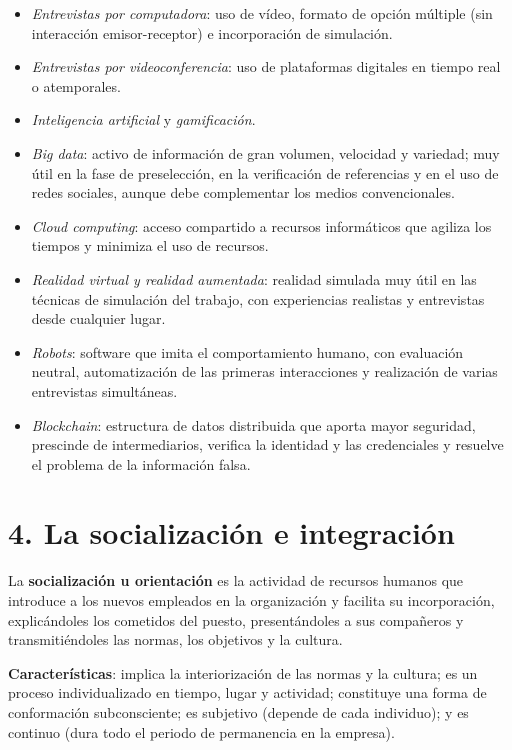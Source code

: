 \documentclass[12pt]{book} %
\providecommand{\tightlist}{%
  \setlength{\itemsep}{0pt}\setlength{\parskip}{0pt}}
\begin{document}
\begin{itemize}
\tightlist
\item
  \emph{Entrevistas por computadora}: uso de vídeo, formato de opción
  múltiple (sin interacción emisor-receptor) e incorporación de
  simulación.
\item
  \emph{Entrevistas por videoconferencia}: uso de plataformas digitales
  en tiempo real o atemporales.
\item
  \emph{Inteligencia artificial} y \emph{gamificación}.
\item
  \emph{Big data}: activo de información de gran volumen, velocidad y
  variedad; muy útil en la fase de preselección, en la verificación de
  referencias y en el uso de redes sociales, aunque debe complementar
  los medios convencionales.
\item
  \emph{Cloud computing}: acceso compartido a recursos informáticos que
  agiliza los tiempos y minimiza el uso de recursos.
\item
  \emph{Realidad virtual y realidad aumentada}: realidad simulada muy
  útil en las técnicas de simulación del trabajo, con experiencias
  realistas y entrevistas desde cualquier lugar.
\item
  \emph{Robots}: software que imita el comportamiento humano, con
  evaluación neutral, automatización de las primeras interacciones y
  realización de varias entrevistas simultáneas.
\item
  \emph{Blockchain}: estructura de datos distribuida que aporta mayor
  seguridad, prescinde de intermediarios, verifica la identidad y las
  credenciales y resuelve el problema de la información falsa.
\end{itemize}

\hypertarget{la-socializaciuxf3n-e-integraciuxf3n}{%
\section{4. La socialización e
integración}\label{la-socializaciuxf3n-e-integraciuxf3n}}

La \textbf{socialización u orientación} es la actividad de recursos
humanos que introduce a los nuevos empleados en la organización y
facilita su incorporación, explicándoles los cometidos del puesto,
presentándoles a sus compañeros y transmitiéndoles las normas, los
objetivos y la cultura.

\textbf{Características}: implica la interiorización de las normas y la
cultura; es un proceso individualizado en tiempo, lugar y actividad;
constituye una forma de conformación subconsciente; es subjetivo
(depende de cada individuo); y es continuo (dura todo el periodo de
permanencia en la empresa).
\end{document}
